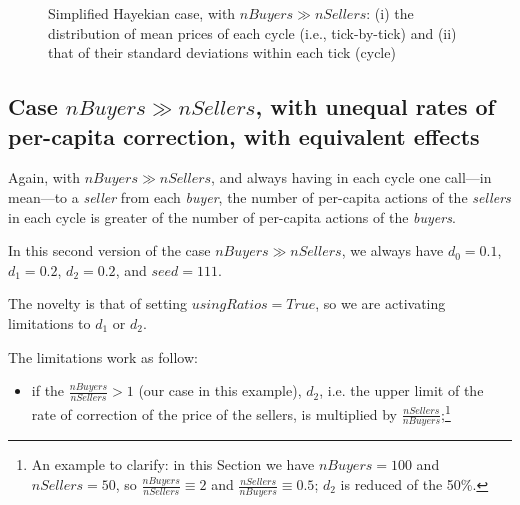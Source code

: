 \documentclass[10pt]{report}
\begin{document}
\begin{appendices}
\begin{figure}[H]
\begin{center}
\caption{Simplified Hayekian case, with $nBuyers \gg nSellers$: (i) the distribution of mean prices of each cycle (i.e., tick-by-tick) and (ii) that of their standard deviations within each tick (cycle)}
\label{output_3_3a.png}
\end{center}
\end{figure}

\subsection{Case $nBuyers \gg nSellers$, with unequal rates of per-capita correction, with equivalent effects}\label{nBuyers > nSellers with unequal rates of per-capita correction, with equivalent effects}

Again, with $nBuyers \gg nSellers$, and always having in each cycle one call---in mean---to a  \emph{seller} from each  \emph{buyer}, the number of per-capita actions of the \emph{sellers} in each cycle is greater of the number of per-capita actions of the \emph{buyers}.

In this second version of the case $nBuyers \gg nSellers$, we always have $d_0=0.1$, $d_1=0.2$,  $d_2=0.2$, and $seed=111$.

The novelty is that of setting $usingRatios=True$, so we are activating limitations to $d_1$ or $d_2$.

The limitations work as follow:
\begin{itemize}

\item if the $\frac{nBuyers}{nSellers}>1$ (our case in this example), $d_2$, i.e. the upper limit of the rate of correction of the price of the sellers, is multiplied by $\frac{nSellers}{nBuyers}$;\footnote{An example to clarify: in this Section we have $nBuyers=100$ and $nSellers=50$, so $\frac{nBuyers}{nSellers} \equiv 2$ and $\frac{nSellers}{nBuyers} \equiv 0.5$; $d_2$ is reduced of the 50\%.}


\end{itemize}
\end{appendices}
\end{document}
